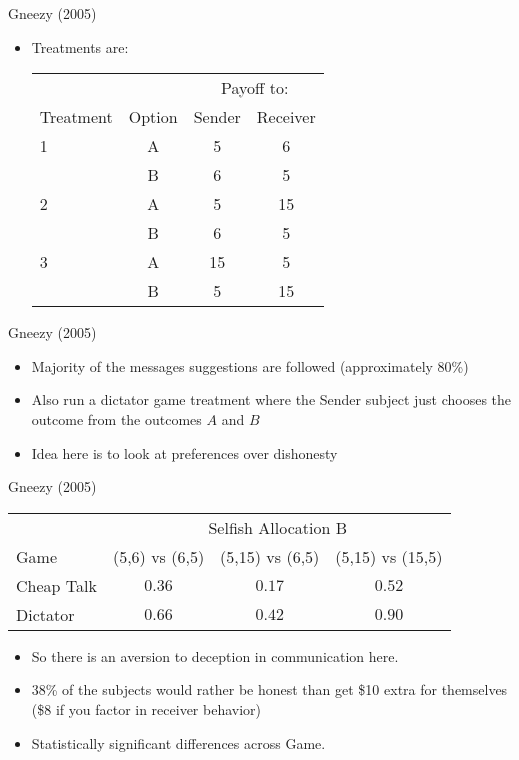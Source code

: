 \documentclass{beamer}
\begin{document}
\begin{frame}{Gneezy (2005)}
	\begin{itemize}
		\item Treatments are:

		\begin{tabular}{lccc}\hline
		& & \multicolumn{2}{c}{Payoff to:}\\ \cline{3-4}
		Treatment & Option & Sender & Receiver \\ \hline
		1		  &   A  & 5 & 6  \\
				  &   B  & 6 & 5  \\
		2		  &   A  & 5 & 15 \\
				  &   B  & 6 & 5  \\
		3		  &   A  & 15 & 5 \\
				  &   B  & 5 & 15 \\ \hline
		\end{tabular}
	\end{itemize}
\end{frame}
\begin{frame}{Gneezy (2005)}
	\begin{itemize}
		\item Majority of the messages suggestions are followed (approximately 80\%)
		\item Also run a dictator game treatment where the Sender subject just chooses the outcome from the outcomes $A$ and $B$
		\item Idea here is to look at preferences over dishonesty
	\end{itemize}
\end{frame}

\begin{frame}{Gneezy (2005)}
	\begin{center}
		\begin{tabular}{lccc}\hline
		& \multicolumn{3}{c}{Selfish Allocation B }\\ \cline{2-4}
		Game & (5,6) vs (6,5) & (5,15) vs (6,5) & (5,15) vs (15,5) \\ \hline
		Cheap Talk &   $0.36$  & $0.17$ & $0.52$  \\
		Dictator   &   $0.66$  & $0.42$ & $0.90$  \\ \hline
		\end{tabular}
	\end{center}

	\begin{itemize}
		\item So there is an aversion to deception in communication here.
		\item 38\% of the subjects would rather be honest than get \$10 extra for themselves (\$8 if you factor in receiver behavior)
		\item Statistically significant differences across Game.
	\end{itemize}
\end{frame}
\end{document}

